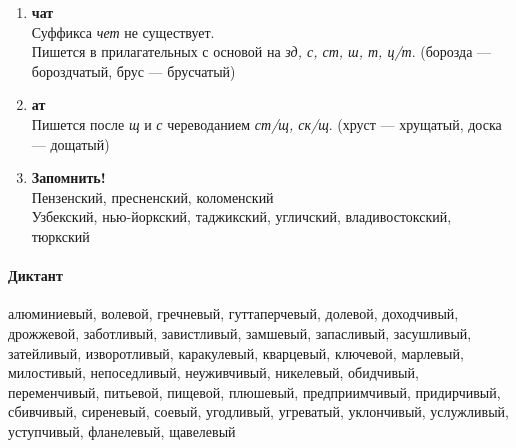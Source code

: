 \documentclass{article}
\begin{document}
\begin{enumerate}
\item
  \textbf{чат}\\
  Суффикса \emph{чет} не существует.\\
  Пишется в прилагательных с основой на \emph{зд, с, ст, ш, т, ц/т}. (борозда --- бороздчатый, брус --- брусчатый)

\item
  \textbf{ат}\\
  Пишется после \emph{щ} и \emph{с} череводанием \emph{ст/щ, ск/щ}. (хруст --- хрущатый, доска --- дощатый)

\item
  \textbf{Запомнить!}\\
  Пензенский, пресненский, коломенский\\
  Узбекский, нью-йоркский, таджикский, угличский, владивостокский, тюркский
\end{enumerate}


\paragraph{Диктант} алюминиевый, волевой, гречневый, гуттаперчевый, долевой, доходчивый, дрожжевой, заботливый,
завистливый, замшевый, запасливый, засушливый, затейливый, изворотливый, каракулевый, кварцевый, ключевой, марлевый,
милостивый, непоседливый, неуживчивый, никелевый, обидчивый, переменчивый, питьевой, пищевой, плюшевый, предприимчивый,
придирчивый, сбивчивый, сиреневый, соевый, угодливый, угреватый, уклончивый, услужливый, уступчивый, фланелевый, щавелевый
\end{document}
